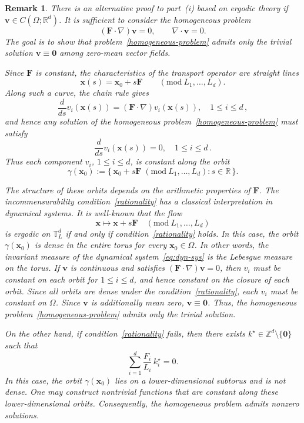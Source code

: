 \documentclass[12pt]{article}
\newtheorem{remark}{Remark}
\begin{document}
\begin{remark}
There is an alternative proof to part~(i) based on ergodic theory if $\boldsymbol{v}\in C(\Omega;\mathbb{R}^d)$. It is sufficient to consider the homogeneous problem
\begin{equation}
\label{homogeneous-problem}
(\mathbf{F}\cdot\nabla)\boldsymbol{v}=0,
\qquad
\nabla\cdot\boldsymbol{v}=0.
\end{equation}
The goal is to show that problem~\eqref{homogeneous-problem} admits only the
trivial solution $\boldsymbol{v}\equiv\boldsymbol{0}$ among zero-mean vector
fields.


Since $\mathbf{F}$ is constant, the characteristics of the transport operator are straight lines \[ \boldsymbol{x}(s)=\boldsymbol{x}_0 + s\mathbf{F} \qquad (\mathrm{mod}\ L_1,\dots,L_d). \] Along such a curve, the chain rule gives \[ \frac{d}{ds} v_i(\boldsymbol{x}(s)) = (\mathbf{F}\cdot\nabla)v_i(\boldsymbol{x}(s)),\quad 1\leq i \leq d\,, \] and hence any solution of the homogeneous problem~\eqref{homogeneous-problem} must satisfy 
\[ \frac{d}{ds}v_i(\boldsymbol{x}(s))=0,\quad 1\leq i \leq d\,. 
\] 
Thus each component $v_i$, $1\leq i \leq d$, is constant along the \emph{orbit} 
\[ \gamma(\boldsymbol{x}_0) := \{\, \boldsymbol{x}_0 + s\mathbf{F} \; (\mathrm{mod}\ L_1,\dots,L_d): s\in\mathbb{R}\,\}. \] 

The structure of these orbits depends on the arithmetic properties of $\mathbf{F}$. The incommensurability condition~\eqref{rationality} has a classical interpretation in dynamical systems. It is well-known that the flow \begin{equation}\label{eq:dyn-sys} 
\boldsymbol{x}\mapsto \boldsymbol{x}+s\mathbf{F} \quad (\mathrm{mod}\ L_1,\dots,L_d) \end{equation} 
is \emph{ergodic} on $\mathbb{T}^d_L$ if and only if condition~\eqref{rationality} holds. In this case, the orbit $\gamma(\boldsymbol{x}_0)$ is dense in the entire torus for every $\boldsymbol{x}_0\in\Omega$. In other words, the invariant measure of the dynamical system~\eqref{eq:dyn-sys} is the Lebesgue measure on the torus. If $\boldsymbol{v}$ is continuous and satisfies $(\mathbf{F}\cdot\nabla)\boldsymbol{v}=0$, then $v_i$ must be constant on each orbit for $1\leq i \leq d$, and hence constant on the closure of each orbit. Since all orbits are dense under the condition~\eqref{rationality}, each $v_i$ must be constant on $\Omega$. Since $\boldsymbol{v}$ is additionally mean zero, $\boldsymbol{v}\equiv \boldsymbol{0}$. Thus, the homogeneous problem~\eqref{homogeneous-problem} admits only the trivial solution.

On the other hand, if condition~\eqref{rationality} fails, then there exists $k^\star\in\mathbb{Z}^d\setminus\{\boldsymbol{0}\}$ such that \[ \sum_{i=1}^d \frac{F_i}{L_i}\,k^\star_i =0. \] In this case, the orbit $\gamma(\boldsymbol{x}_0)$ lies on a lower-dimensional subtorus and is not dense. One may construct nontrivial functions that are constant along these lower-dimensional orbits. Consequently, the homogeneous problem admits nonzero solutions.
\end{remark}
\end{document}
